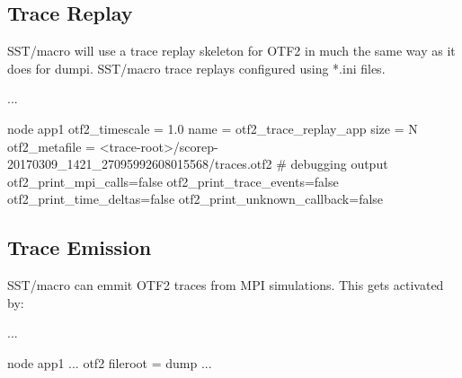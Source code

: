 \subsection{Trace Replay}
\label{subsec:otf:traceReplay}
SST/macro will use a trace replay skeleton for OTF2 in much the same way as it does for dumpi. SST/macro trace replays configured using *.ini files. 

\begin{ViFile}
...

node {
 app1 {
  otf2_timescale = 1.0
  name = otf2_trace_replay_app
  size = N
  otf2_metafile = <trace-root>/scorep-20170309_1421_27095992608015568/traces.otf2
 # debugging output
  otf2_print_mpi_calls=false
  otf2_print_trace_events=false
  otf2_print_time_deltas=false
  otf2_print_unknown_callback=false
 }
}

\end{ViFile}

\subsection{Trace Emission}
\label{subsec:otf:traceEmission}
SST/macro can emmit OTF2 traces from MPI simulations. This gets activated by:

\begin{ViFile}
...

node {
 app1 {
  ...
    otf2 {
      fileroot = dump
    }
  ...
 }
}

\end{ViFile}
